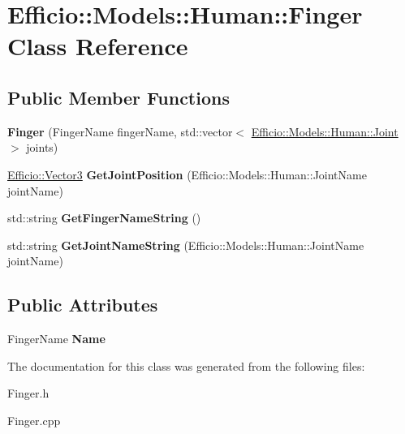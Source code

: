 \hypertarget{class_efficio_1_1_models_1_1_human_1_1_finger}{}\section{Efficio\+:\+:Models\+:\+:Human\+:\+:Finger Class Reference}
\label{class_efficio_1_1_models_1_1_human_1_1_finger}
\subsection*{Public Member Functions}
\begin{DoxyCompactItemize}
\item 
{\bfseries Finger} (Finger\+Name finger\+Name, std\+::vector$<$ \hyperlink{class_efficio_1_1_models_1_1_human_1_1_joint}{Efficio\+::\+Models\+::\+Human\+::\+Joint} $>$ joints)\hypertarget{class_efficio_1_1_models_1_1_human_1_1_finger_a0e3d5acf27ade2789e116f004dd04154}{}\label{class_efficio_1_1_models_1_1_human_1_1_finger_a0e3d5acf27ade2789e116f004dd04154}

\item 
\hyperlink{class_efficio_1_1_vector3}{Efficio\+::\+Vector3} {\bfseries Get\+Joint\+Position} (Efficio\+::\+Models\+::\+Human\+::\+Joint\+Name joint\+Name)\hypertarget{class_efficio_1_1_models_1_1_human_1_1_finger_a4c10fccb5ca87b762fe6752ec24d5052}{}\label{class_efficio_1_1_models_1_1_human_1_1_finger_a4c10fccb5ca87b762fe6752ec24d5052}

\item 
std\+::string {\bfseries Get\+Finger\+Name\+String} ()\hypertarget{class_efficio_1_1_models_1_1_human_1_1_finger_aaef48fbc391d379b8d0417cac6229754}{}\label{class_efficio_1_1_models_1_1_human_1_1_finger_aaef48fbc391d379b8d0417cac6229754}

\item 
std\+::string {\bfseries Get\+Joint\+Name\+String} (Efficio\+::\+Models\+::\+Human\+::\+Joint\+Name joint\+Name)\hypertarget{class_efficio_1_1_models_1_1_human_1_1_finger_ac061a5c711691cc4434e0d861ec8a684}{}\label{class_efficio_1_1_models_1_1_human_1_1_finger_ac061a5c711691cc4434e0d861ec8a684}

\end{DoxyCompactItemize}
\subsection*{Public Attributes}
\begin{DoxyCompactItemize}
\item 
Finger\+Name {\bfseries Name}\hypertarget{class_efficio_1_1_models_1_1_human_1_1_finger_ae73134fdf9c0ba485fce08abdf2e5e59}{}\label{class_efficio_1_1_models_1_1_human_1_1_finger_ae73134fdf9c0ba485fce08abdf2e5e59}

\end{DoxyCompactItemize}


The documentation for this class was generated from the following files\+:\begin{DoxyCompactItemize}
\item 
Finger.\+h\item 
Finger.\+cpp\end{DoxyCompactItemize}
